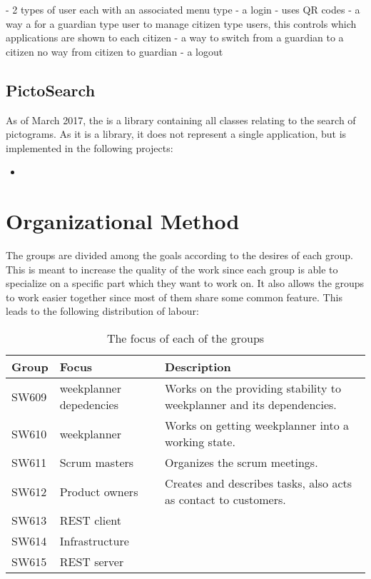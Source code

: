 - 2 types of user each with an associated menu type
- a login - uses QR codes
- a way a for a guardian type user to manage citizen type users, this
controls which applications are shown to each citizen
- a way to switch from a guardian to a citizen no way from citizen to guardian
- a logout


\subsection{PictoSearch}
As of March 2017, the  is a library containing all
classes relating to the search of pictograms. As it is a library, it does not
represent a single application, but is implemented in the following projects:
\begin{itemize}
  \item 
\end{itemize}

\nl



\section{Organizational Method}

The groups are divided among the goals according to the desires of each group.
This is meant to increase the quality of the work since each group is able to
specialize on a specific part which they want to work on. It also allows the
groups to work easier together since most of them share some common feature.
This leads to the following distribution of labour:

\begin{table}[H]
\centering
\begin{tabular}{|p{2cm}|p{3cm}|p{8cm}|}
\hline
Group & Focus & Description \\ \hline
SW609 & weekplanner depedencies & Works on the providing stability to
weekplanner and its dependencies.\\\hline 
SW610 & weekplanner & Works on getting weekplanner into a working
state.\\\hline 
SW611 & Scrum masters & Organizes the scrum meetings. \\\hline 
SW612 & Product owners & Creates and describes tasks, also acts as contact to
customers. \\\hline 
SW613 & REST client & \\ \hline

SW614 & Infrastructure & \\ \hline

SW615 & REST server & \\ \hline

\end{tabular}
\caption{The focus of each of the groups}
\label{GroupDivision}
\end{table}

